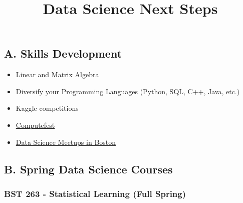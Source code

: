 \documentclass[
]{article}
\title{Data Science Next Steps}
\author{}
\date{\vspace{-2.5em}}
\providecommand{\tightlist}{%
  \setlength{\itemsep}{0pt}\setlength{\parskip}{0pt}}
\begin{document}
\maketitle

\hypertarget{a.-skills-development}{%
\subsection{A. Skills Development}\label{a.-skills-development}}

\begin{itemize}
\tightlist
\item
  Linear and Matrix Algebra
\item
  Diversify your Programming Languages (Python, SQL, C++, Java, etc.)
\item
  Kaggle competitions
\item
  \href{https://www.computefest.seas.harvard.edu/}{Computefest}
\item
  \href{https://www.meetup.com/topics/data-science/us/ma/boston/?_cookie-check=nhT68rU50hwPaQWQ}{Data
  Science Meetups in Boston}
\end{itemize}

\hypertarget{b.-spring-data-science-courses}{%
\subsection{B. Spring Data Science
Courses}\label{b.-spring-data-science-courses}}

\hypertarget{bst-263---statistical-learning-full-spring}{%
\subsubsection{BST 263 - Statistical Learning (Full
Spring)}\label{bst-263---statistical-learning-full-spring}}
\end{document}
